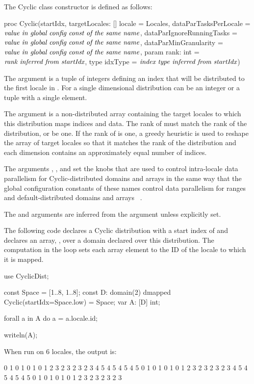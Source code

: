 The Cyclic class constructor is defined as follows:
\begin{chapel}
proc Cyclic(startIdx,
           targetLocales: [] locale = Locales,
           dataParTasksPerLocale = $\mbox{{\it value in global config const of the same name}}$,
           dataParIgnoreRunningTasks = $\mbox{{\it value in global config const of the same name}}$,
           dataParMinGranularity = $\mbox{{\it value in global config const of the same name}}$,
           param rank: int = $\mbox{{\it rank inferred from startIdx}}$,
           type idxType = $\mbox{{\it index type inferred from startIdx}}$)
\end{chapel}

The argument  is a tuple of integers defining an index that
will be distributed to the first locale in . For a single
dimensional distribution  can be an integer or a tuple with a
single element.

The argument  is a non-distributed array
containing the target locales to which this distribution maps indices
and data.  The rank of  must match the rank of the
distribution, or be one.  If the rank of
 is one, a greedy heuristic is used to reshape the
array of target locales so that it matches the rank of the
distribution and each dimension contains an approximately equal number
of indices.

The
arguments , ,
and  set the knobs that are used to
control intra-locale data parallelism for Cyclic-distributed domains
and arrays in the same way that the global configuration constants of
these names control data parallelism for ranges and
default-distributed domains and arrays ~.

The  and  arguments are inferred from the
 argument unless explicitly set.

\begin{example}
The following code declares a Cyclic distribution with a start index
of  and declares an array, , over a domain
declared over this distribution.  The computation in the 
loop sets each array element to the ID of the locale to which it is
mapped.
\begin{chapel}
use CyclicDist;

const Space = [1..8, 1..8];
const D: domain(2) dmapped Cyclic(startIdx=Space.low) = Space;
var A: [D] int;

forall a in A do
  a = a.locale.id;

writeln(A);
\end{chapel}
When run on 6 locales, the output is:
\begin{chapel}
0 1 0 1 0 1 0 1
2 3 2 3 2 3 2 3
4 5 4 5 4 5 4 5
0 1 0 1 0 1 0 1
2 3 2 3 2 3 2 3
4 5 4 5 4 5 4 5
0 1 0 1 0 1 0 1
2 3 2 3 2 3 2 3
\end{chapel}
\end{example}





